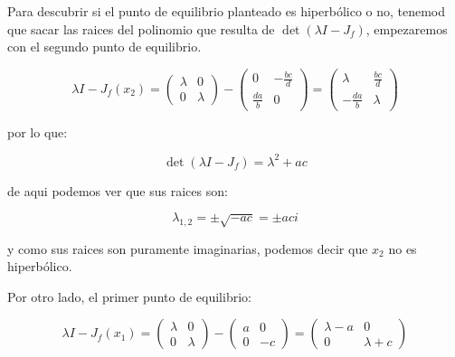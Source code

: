             Para descubrir si el punto de equilibrio planteado es hiperbólico o no, tenemod que sacar las raices del polinomio que resulta de $\det{(\lambda I - J_f)}$, empezaremos con el segundo punto de equilibrio.

            \begin{equation*}
                \lambda I - J_f(x_2) =
                \begin{pmatrix}
                    \lambda & 0 \\
                    0 & \lambda
                \end{pmatrix} -
                \begin{pmatrix}
                    0 & -\frac{bc}{d} \\
                    \frac{da}{b} & 0
                \end{pmatrix} =
                \begin{pmatrix}
                    \lambda & \frac{bc}{d} \\
                    -\frac{da}{b} & \lambda
                \end{pmatrix}
            \end{equation*}

            por lo que:

            \begin{equation*}
                \det{(\lambda I - J_f)} = \lambda^2 + ac
            \end{equation*}

            de aqui podemos ver que sus raices son:

            \begin{equation*}
                \lambda_{1,2} = \pm \sqrt{-ac} = \pm ac i 
            \end{equation*}

            y como sus raices son puramente imaginarias, podemos decir que $x_2$ no es hiperbólico.

            Por otro lado, el primer punto de equilibrio:

            \begin{equation*}
                \lambda I - J_f(x_1) =
                \begin{pmatrix}
                    \lambda & 0 \\
                    0 & \lambda
                \end{pmatrix} -
                \begin{pmatrix}
                    a & 0 \\
                    0 & -c
                \end{pmatrix} =
                \begin{pmatrix}
                    \lambda - a & 0 \\
                    0 & \lambda + c
                \end{pmatrix}
            \end{equation*}

